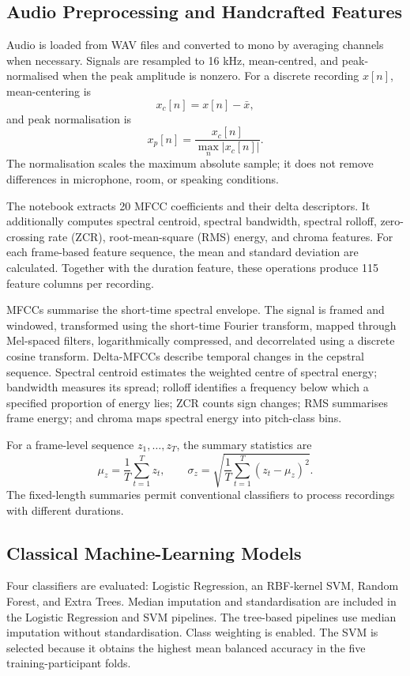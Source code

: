 \documentclass[11pt,a4paper]{article}
\begin{document}
\subsection{Audio Preprocessing and Handcrafted Features}
Audio is loaded from WAV files and converted to mono by averaging channels when necessary. Signals are resampled to 16 kHz, mean-centred, and peak-normalised when the peak amplitude is nonzero. For a discrete recording $x[n]$, mean-centering is
\begin{equation}
x_c[n]=x[n]-\bar{x},
\end{equation}
and peak normalisation is
\begin{equation}
x_p[n]=\frac{x_c[n]}{\max_n |x_c[n]|}.
\end{equation}
The normalisation scales the maximum absolute sample; it does not remove differences in microphone, room, or speaking conditions.

The notebook extracts 20 MFCC coefficients and their delta descriptors. It additionally computes spectral centroid, spectral bandwidth, spectral rolloff, zero-crossing rate (ZCR), root-mean-square (RMS) energy, and chroma features. For each frame-based feature sequence, the mean and standard deviation are calculated. Together with the duration feature, these operations produce 115 feature columns per recording.

MFCCs summarise the short-time spectral envelope. The signal is framed and windowed, transformed using the short-time Fourier transform, mapped through Mel-spaced filters, logarithmically compressed, and decorrelated using a discrete cosine transform. Delta-MFCCs describe temporal changes in the cepstral sequence. Spectral centroid estimates the weighted centre of spectral energy; bandwidth measures its spread; rolloff identifies a frequency below which a specified proportion of energy lies; ZCR counts sign changes; RMS summarises frame energy; and chroma maps spectral energy into pitch-class bins.

For a frame-level sequence $z_1,\ldots,z_T$, the summary statistics are
\begin{equation}
\mu_z=\frac{1}{T}\sum_{t=1}^{T}z_t,\qquad
\sigma_z=\sqrt{\frac{1}{T}\sum_{t=1}^{T}(z_t-\mu_z)^2}.
\end{equation}
The fixed-length summaries permit conventional classifiers to process recordings with different durations.

\subsection{Classical Machine-Learning Models}
Four classifiers are evaluated: Logistic Regression, an RBF-kernel SVM, Random Forest, and Extra Trees. Median imputation and standardisation are included in the Logistic Regression and SVM pipelines. The tree-based pipelines use median imputation without standardisation. Class weighting is enabled. The SVM is selected because it obtains the highest mean balanced accuracy in the five training-participant folds.
\end{document}
